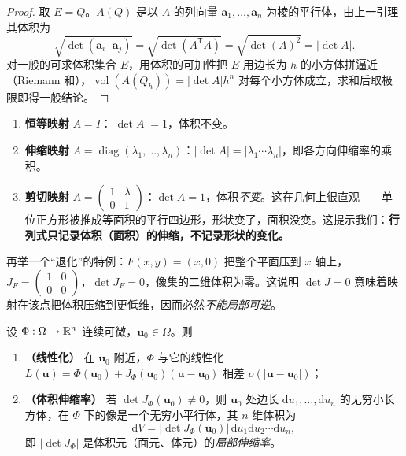 \begin{proof}
取 \(E=Q\)。\(A(Q)\) 是以 \(A\) 的列向量 \(\mathbf{a}_1,\dots,\mathbf{a}_n\) 为棱的平行体，由上一引理其体积为
\[
\sqrt{\det(\mathbf{a}_i\cdot\mathbf{a}_j)}=\sqrt{\det(A^{\mathsf T}A)}=\sqrt{\det(A)^2}=\left|\det A\right|.
\]
对一般的可求体积集合 \(E\)，用体积的可加性把 \(E\) 用边长为 \(h\) 的小方体拼逼近（Riemann 和），\(\operatorname{vol}(A(Q_h))=\lvert\det A\rvert h^n\) 对每个小方体成立，求和后取极限即得一般结论。
\end{proof}

\begin{remark}
\begin{enumerate}[label=(\arabic*)]
  \item \textbf{恒等映射} \(A=I\)：\(\left|\det A\right|=1\)，体积不变。
  \item \textbf{伸缩映射} \(A=\operatorname{diag}(\lambda_1,\dots,\lambda_n)\)：\(\left|\det A\right|=\lvert\lambda_1\cdots\lambda_n\rvert\)，即各方向伸缩率的乘积。
  \item \textbf{剪切映射} \(A=\begin{pmatrix}1&\lambda\\0&1\end{pmatrix}\)：\(\det A=1\)，体积\emph{不变}。这在几何上很直观——单位正方形被推成等面积的平行四边形，形状变了，面积没变。这提示我们：\textbf{行列式只记录体积（面积）的伸缩，不记录形状的变化。}
\end{enumerate}
再举一个“退化”的特例：\(F(x,y)=(x,0)\) 把整个平面压到 \(x\) 轴上，\(J_F=\begin{pmatrix}1&0\\0&0\end{pmatrix}\)，\(\det J_F=0\)，像集的二维体积为零。这说明 \(\det J=0\) 意味着映射在该点把体积压缩到更低维，因而必然\emph{不能局部可逆}。
\end{remark}

\begin{theorem}\label{thm:jacobian-volume}
设 \(\Phi:\Omega\to\mathbb{R}^n\) 连续可微，\(\mathbf{u}_0\in\Omega\)。则
\begin{enumerate}[label=(\arabic*)]
  \item \textbf{（线性化）} 在 \(\mathbf{u}_0\) 附近，\(\Phi\) 与它的线性化 \(L(\mathbf{u})=\Phi(\mathbf{u}_0)+J_\Phi(\mathbf{u}_0)(\mathbf{u}-\mathbf{u}_0)\) 相差 \(o(\lvert\mathbf{u}-\mathbf{u}_0\rvert)\)；
  \item \textbf{（体积伸缩率）} 若 \(\det J_\Phi(\mathbf{u}_0)\ne0\)，则 \(\mathbf{u}_0\) 处边长 \(\mathrm{d}u_1,\dots,\mathrm{d}u_n\) 的无穷小长方体，在 \(\Phi\) 下的像是一个无穷小平行体，其 \(n\) 维体积为
  \[
  \mathrm{d}V=\left|\det J_\Phi(\mathbf{u}_0)\right|\,\mathrm{d}u_1\mathrm{d}u_2\cdots \mathrm{d}u_n ,
  \]
  即 \(\left|\det J_\Phi\right|\) 是体积元（面元、体元）的\emph{局部伸缩率}。
\end{enumerate}
\end{theorem}

